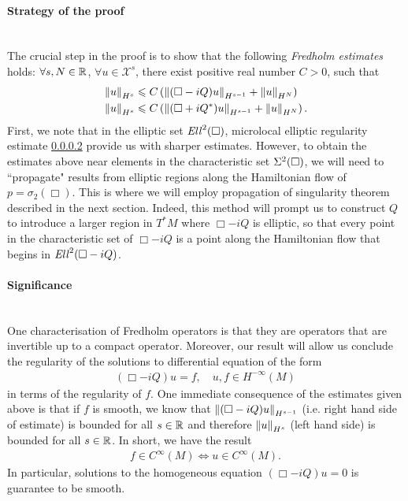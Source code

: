 \documentclass[12pt]{article}
\begin{document}
\paragraph{Strategy of the proof} \hfill \\
The crucial step in the proof is to show that the following \textit{Fredholm estimates} holds: $\forall s, N \in \R$, $\forall u \in \mathcal{X}^s$, there exist positive real number $C > 0$, such that
\begin{align*}
&\norm[u]_{H^s} \leq C \brac{ \norm[(\Box - i Q)u]_{H^{s - 1}} + \norm[u]_{H^N}} \\
&\norm[u]_{H^s} \leq C \brac{ \norm[(\Box + i Q^*)u]_{H^{s - 1}} + \norm[u]_{H^N}}. 
\end{align*}
First, we note that in the elliptic set $\Ell^2(\Box)$, microlocal elliptic regularity estimate \ref{} provide us with sharper estimates. However, to obtain the estimates above near elements in the characteristic set $\Char^2(\Box)$, we will need to ``propagate" results from elliptic regions along the Hamiltonian flow of $p = \sigma_2(\Box)$. This is where we will employ propagation of singularity theorem described in the next section. Indeed, this method will prompt us to construct $Q$ to introduce a larger region in $T^*M$ where $\Box - iQ$ is elliptic, so that every point in the characteristic set of $\Box - iQ$ is a point along the Hamiltonian flow that begins in $\Ell^2(\Box - iQ)$. 



\paragraph{Significance} \hfill \\
One characterisation of Fredholm operators is that they are operators that are invertible up to a compact operator. Moreover, our result will allow us conclude the regularity of the solutions to differential equation of the form 
\begin{align*}
(\Box - iQ) u = f, \quad u, f \in H^{-\infty}(M)
\end{align*}
in terms of the regularity of $f$. One immediate consequence of the estimates given above is that if $f$ is smooth, we know that $\norm[(\Box - iQ)u ]_{H^{s-1}}$ (i.e. right hand side of estimate) is bounded for all $s \in \R$ and therefore $\norm[u]_{H^s}$ (left hand side) is bounded for all $s \in \R$. In short, we have the result 
\begin{align*}
f \in C^\infty(M) \iff u \in C^\infty(M). 
\end{align*}
In particular, solutions to the homogeneous equation $(\Box - iQ)u = 0$ is guarantee to be smooth. \\
\end{document}
